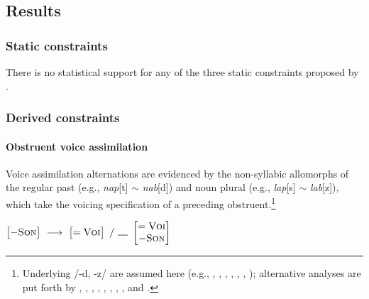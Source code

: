 \subsection{Results}

\subsubsection{Static constraints}

There is no statistical support for any of the three static constraints proposed by \citeauthor{Pierrehumbert1994}. 

\subsubsection{Derived constraints}

\paragraph{Obstruent voice assimilation}

Voice assimilation alternations are evidenced by the non-syllabic allomorphs of the regular past (e.g., \emph{nap}[t] $\sim$ \emph{nab}[d]) and noun plural (e.g., \emph{lap}[s] $\sim$ \emph{lab}[z]), which take the voicing specification of a preceding obstruent.\footnote{Underlying /-d, -z/ are assumed here (e.g., \citealt{Anderson1973a}, \citealt[284f.]{Bakovic2005b}, \citealt{Basboll1972}, \citealt[210]{SPE}, \citealt[282]{Hockett1958}, \citealt[102]{Pinker1988}, \citealt{Shibatani1972}); alternative analyses are put forth by \citet[210f.]{LANGUAGE}, \citet[135]{Borowsky1986}, \citet{Hoard1971}, \citet{Kiparsky1985}, \citet{Lightner1970}, \citet{Luelsdorff1969}, \citet{Miner1975}, \citet[426]{Nida1948}, and \citet{Zwicky1975}.}

\begin{example}
\label{ovarule}
$\begin{bmatrix} -\textsc{Son} \end{bmatrix}~\goesto~\begin{bmatrix} =\textsc{Voi} \end{bmatrix}~/~\gap~\begin{bmatrix} =\textsc{Voi} \\ -\textsc{Son} \end{bmatrix}$
\end{example}

